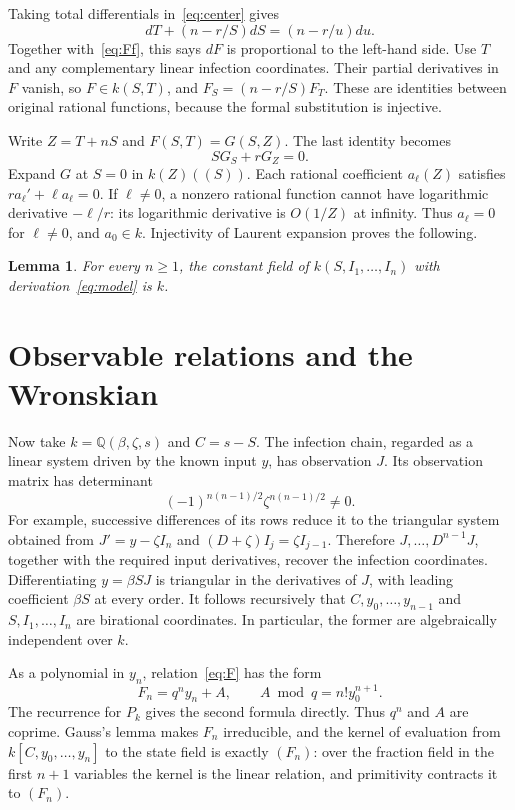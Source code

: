 \documentclass[11pt,a4paper]{article}
\newtheorem{lemma}{Lemma}
\newcommand{\Q}{\mathbb{Q}}
\begin{document}
Taking total differentials in~\eqref{eq:center} gives
\begin{equation}
 dT+(n-r/S)dS=(n-r/u)du.
\end{equation}
Together with~\eqref{eq:Ff}, this says $dF$ is proportional to the left-hand side. Use $T$ and any complementary linear infection coordinates. Their partial derivatives in $F$ vanish, so $F\in k(S,T)$, and
$F_S=(n-r/S)F_T$. These are identities between original rational functions, because the formal substitution is injective.

Write $Z=T+nS$ and $F(S,T)=G(S,Z)$. The last identity becomes
\begin{equation}
 SG_S+rG_Z=0.
\end{equation}
Expand $G$ at $S=0$ in $k(Z)((S))$. Each rational coefficient $a_\ell(Z)$ satisfies $r a_\ell'+\ell a_\ell=0$. If $\ell\ne0$, a nonzero rational function cannot have logarithmic derivative $-\ell/r$: its logarithmic derivative is $O(1/Z)$ at infinity. Thus $a_\ell=0$ for $\ell\ne0$, and $a_0\in k$. Injectivity of Laurent expansion proves the following.
\begin{lemma}\label{lem:constants}
For every $n\geq1$, the constant field of $k(S,I_1,\ldots,I_n)$ with derivation~\eqref{eq:model} is $k$.
\end{lemma}

\section{Observable relations and the Wronskian}
Now take $k=\Q(\beta,\zeta,s)$ and $C=s-S$.
The infection chain, regarded as a linear system driven by the known input $y$, has observation $J$. Its observation matrix has determinant
\begin{equation}
 (-1)^{n(n-1)/2}\zeta^{n(n-1)/2}\ne0.
\end{equation}
For example, successive differences of its rows reduce it to the triangular system obtained from $J'=y-\zeta I_n$ and $(D+\zeta)I_j=\zeta I_{j-1}$. Therefore $J,\ldots,D^{n-1}J$, together with the required input derivatives, recover the infection coordinates. Differentiating $y=\beta SJ$ is triangular in the derivatives of $J$, with leading coefficient $\beta S$ at every order. It follows recursively that
$C,y_0,\ldots,y_{n-1}$ and $S,I_1,\ldots,I_n$ are birational coordinates. In particular, the former are algebraically independent over $k$.

As a polynomial in $y_n$, relation~\eqref{eq:F} has the form
\begin{equation}
 F_n=q^ny_n+A,\qquad A\bmod q=n!y_0^{n+1}.
\end{equation}
The recurrence for $P_k$ gives the second formula directly. Thus $q^n$ and $A$ are coprime. Gauss's lemma makes $F_n$ irreducible, and the kernel of evaluation from $k[C,y_0,\ldots,y_n]$ to the state field is exactly $(F_n)$: over the fraction field in the first $n+1$ variables the kernel is the linear relation, and primitivity contracts it to $(F_n)$.
\end{document}
